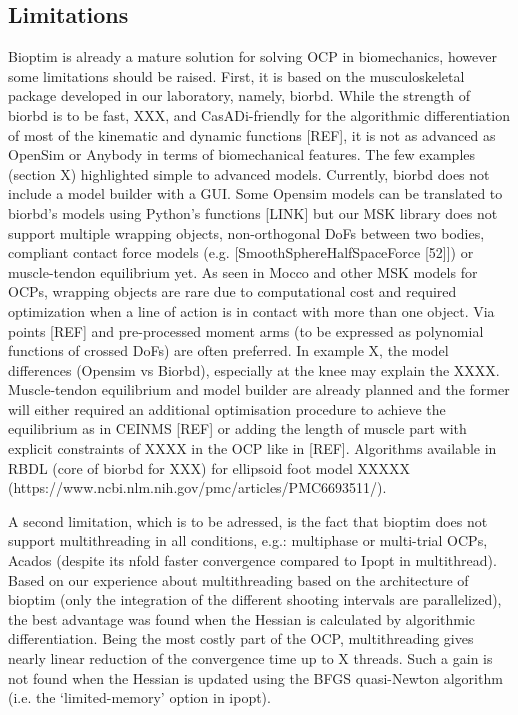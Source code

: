 \subsection{Limitations}

Bioptim is already a mature solution for solving OCP in biomechanics, however some limitations should be raised. First, it is based on the musculoskeletal package developed in our laboratory, namely, biorbd. While the strength of biorbd is to be fast, XXX, and CasADi-friendly for the algorithmic differentiation of most of the kinematic and dynamic functions [REF], it is not as advanced as OpenSim or Anybody in terms of biomechanical features. The few examples (section X) highlighted simple to advanced models. Currently, biorbd does not include a model builder with a GUI. Some Opensim models can be translated to biorbd’s models using Python’s functions [LINK] but our MSK library does not support multiple wrapping objects, non-orthogonal DoFs between two bodies, compliant contact force models (e.g. [SmoothSphereHalfSpaceForce [52]]) or muscle-tendon equilibrium yet. As seen in Mocco and other MSK models for OCPs, wrapping objects are rare due to computational cost and required optimization when a line of action is in contact with more than one object. Via points [REF] and pre-processed moment arms (to be expressed as polynomial functions of crossed DoFs) are often preferred. In example X, the model differences (Opensim vs Biorbd), especially at the knee may explain the XXXX. Muscle-tendon equilibrium and model builder are already planned and the former will either required an additional optimisation procedure to achieve the equilibrium as in CEINMS [REF] or adding the length of muscle part with explicit constraints of XXXX in the OCP like in [REF]. Algorithms available in RBDL (core of biorbd for XXX) for ellipsoid foot model XXXXX (https://www.ncbi.nlm.nih.gov/pmc/articles/PMC6693511/).  

A second limitation, which is to be adressed, is the fact that bioptim does not support multithreading in all conditions, e.g.: multiphase or multi-trial OCPs, Acados (despite its nfold faster convergence compared to Ipopt in multithread). Based on our experience about multithreading based on the architecture of bioptim (only the integration of the different shooting intervals are parallelized), the best advantage was found when the Hessian is calculated by algorithmic differentiation. Being the most costly part of the OCP, multithreading gives nearly linear reduction of the convergence time up to X threads. Such a gain is not found when the Hessian is updated using the BFGS quasi-Newton algorithm (i.e. the ‘limited-memory’ option in ipopt).  

